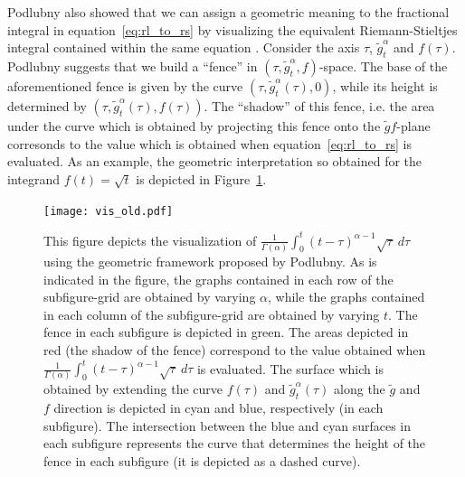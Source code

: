 \documentclass[twoside,reqno,11pt]{fcaa-var} %
\begin{document}
\noindent
Podlubny also showed that we can assign a geometric meaning to the fractional integral in equation~\eqref{eq:rl_to_rs} by visualizing the equivalent Riemann-Stieltjes integral contained within the same equation \cite{bullock88,podlubny02}. Consider the axis $\tau$, $\widetilde{g}_t^{\alpha}$ and $f(\tau)$. Podlubny suggests that we build a ``fence'' in $(\tau,\widetilde{g}_t^{\alpha},f)$-space. The base of the aforementioned fence is given by the curve $(\tau,\widetilde{g}_t^{\alpha}(\tau),0)$, while its height is determined by $(\tau,\widetilde{g}_t^{\alpha}(\tau),f(\tau))$. The ``shadow'' of this fence, i.e. the area under the curve which is obtained by projecting this fence onto the $\widetilde{g}f$-plane corresonds to the value which is obtained when equation~\eqref{eq:rl_to_rs} is evaluated. As an example, the geometric interpretation so obtained for the integrand $f(t)=\sqrt{t}$ is depicted in Figure~\ref{fig:vis_old}.



\begin{figure}[htb]
\centering
\texttt{[image: vis\_old.pdf]}
\caption{This figure depicts the visualization of $\frac{1}{\Gamma(\alpha)}\int_{0}^{t}(t-\tau)^{\alpha-1}\sqrt{\tau}~d\tau$ using the geometric framework proposed by Podlubny.
As is indicated in the figure, the graphs contained in each row of the subfigure-grid are obtained by varying $\alpha$, while the graphs contained in each column of the subfigure-grid are obtained by varying $t$. The fence in each subfigure is depicted in green. The areas depicted in red (the shadow of the fence) correspond to the value obtained when $\frac{1}{\Gamma(\alpha)}\int_{0}^{t}(t-\tau)^{\alpha-1}\sqrt{\tau}~d\tau$ is evaluated.  The surface which is obtained by extending the curve $f(\tau)$ and $\widetilde{g}_t^{\alpha}(\tau)$ along the $\widetilde{g}$ and $f$ direction is depicted in cyan and blue, respectively (in each subfigure). The intersection between the blue and cyan surfaces in each subfigure represents the curve that determines the height of the fence in each subfigure (it is depicted as a dashed curve).   
}
\label{fig:vis_old}
\end{figure}
\end{document}
